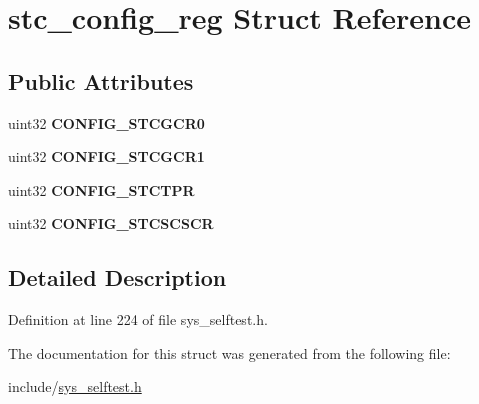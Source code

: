 \hypertarget{structstc__config__reg}{}\section{stc\+\_\+config\+\_\+reg Struct Reference}
\label{structstc__config__reg}
\subsection*{Public Attributes}
\begin{DoxyCompactItemize}
\item 
\mbox{\label{structstc__config__reg_a122fab2dbd24e0ee8bdd7278d80d1018}} 
uint32 {\bfseries C\+O\+N\+F\+I\+G\+\_\+\+S\+T\+C\+G\+C\+R0}
\item 
\mbox{\label{structstc__config__reg_a999e4b2422c7770335a8b1c27c86d69b}} 
uint32 {\bfseries C\+O\+N\+F\+I\+G\+\_\+\+S\+T\+C\+G\+C\+R1}
\item 
\mbox{\label{structstc__config__reg_a7ae3ca2812ece8722335cd1fecb217ad}} 
uint32 {\bfseries C\+O\+N\+F\+I\+G\+\_\+\+S\+T\+C\+T\+PR}
\item 
\mbox{\label{structstc__config__reg_a3583e8100404cb2fec883c80233b99f4}} 
uint32 {\bfseries C\+O\+N\+F\+I\+G\+\_\+\+S\+T\+C\+S\+C\+S\+CR}
\end{DoxyCompactItemize}


\subsection{Detailed Description}


Definition at line 224 of file sys\+\_\+selftest.\+h.



The documentation for this struct was generated from the following file\+:\begin{DoxyCompactItemize}
\item 
include/\mbox{\hyperlink{sys__selftest_8h}{sys\+\_\+selftest.\+h}}\end{DoxyCompactItemize}
